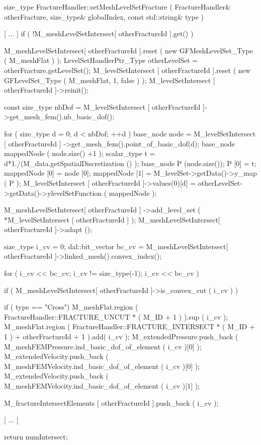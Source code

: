 \begin{Code}[caption={Funzione \texttt{setMeshLevelSetFracture}}]
size_type FractureHandler::setMeshLevelSetFracture ( 
					FractureHandler& otherFracture,
					size_type& globalIndex,
				         const std::string& type )
{	
[ ... ]
if ( !M_meshLevelSetIntersect[ otherFractureId ].get() )
{
   M_meshLevelSetIntersect[ otherFractureId ].reset
	 ( new GFMeshLevelSet_Type ( M_meshFlat ) );
   LevelSetHandlerPtr_Type otherLevelSet = otherFracture.getLevelSet();
   M_levelSetIntersect [ otherFractureId ].reset 
	( new GFLevelSet_Type ( M_meshFlat, 1, false )  );
   M_levelSetIntersect [ otherFractureId ]->reinit();

   const size_type nbDof = 
	M_levelSetIntersect [ otherFractureId ]->get_mesh_fem().nb_basic_dof();

   for ( size_type d = 0; d < nbDof; ++d )
   {
      base_node node = M_levelSetIntersect [ otherFractureId ]
			->get_mesh_fem().point_of_basic_dof(d);
      base_node mappedNode ( node.size() +1 );
      scalar_type t = d*1./(M_data.getSpatialDiscretization () );
      base_node P (node.size());
      P [0] = t;
      mappedNode [0] = node [0];
      mappedNode [1] = M_levelSet->getData()->y_map ( P );
      M_levelSetIntersect [ otherFractureId ]->values(0)[d] = 
	otherLevelSet->getData()->ylevelSetFunction ( mappedNode );
   }

   M_meshLevelSetIntersect[ otherFractureId ]
	->add_level_set ( *M_levelSetIntersect [ otherFractureId ] );
   M_meshLevelSetIntersect[ otherFractureId ]->adapt ();

   size_type i_cv = 0;
   dal::bit_vector bc_cv =
   M_meshLevelSetIntersect[ otherFractureId ]->linked_mesh().convex_index();
		
   for ( i_cv << bc_cv; i_cv != size_type(-1); i_cv << bc_cv )
   {
     if ( M_meshLevelSetIntersect[ otherFractureId ]->is_convex_cut ( i_cv ) )
     {  
        if ( type == "Cross")
        {	
           M_meshFlat.region ( FractureHandler::FRACTURE_UNCUT 
		* ( M_ID + 1 ) ).sup ( i_cv );
	 M_meshFlat.region ( FractureHandler::FRACTURE_INTERSECT 
		* ( M_ID + 1 ) + otherFractureId + 1 ).add( i_cv );
	 M_extendedPressure.push_back ( 
		M_meshFEMPressure.ind_basic_dof_of_element ( i_cv )[0] );
	 M_extendedVelocity.push_back ( 
		M_meshFEMVelocity.ind_basic_dof_of_element ( i_cv )[0] );
	 M_extendedVelocity.push_back ( 
		M_meshFEMVelocity.ind_basic_dof_of_element ( i_cv )[1] );
        }
            	
       M_fractureIntersectElements [ otherFractureId ].push_back ( i_cv );
	
           [ ... ]
      }
   }
}

return numIntersect;
}
\end{Code}


